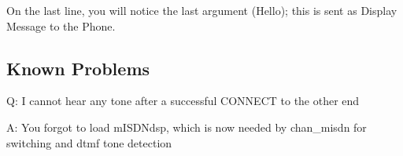 On the last line, you will notice the last argument (Hello); this is sent
as Display Message to the Phone.

\subsection{Known Problems}

Q: I cannot hear any tone after a successful CONNECT to the other end

A: You forgot to load mISDNdsp, which is now needed by chan\_misdn for switching
and dtmf tone detection
